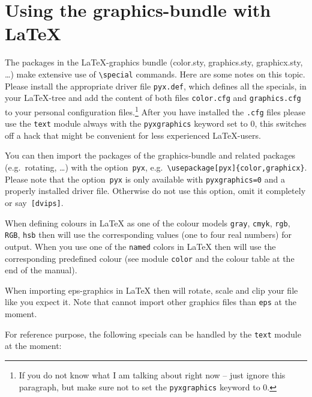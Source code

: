 \section{Using the graphics-bundle with \LaTeX}

The packages in the \LaTeX-graphics bundle (color.sty, graphics.sty,
graphicx.sty, \ldots) make extensive use of \verb|\special| commands.
Here are some notes on this topic. Please install the appropriate
driver file \verb|pyx.def|, which defines all the specials, in your
\LaTeX-tree and add the content of both files \verb|color.cfg| and
\verb|graphics.cfg| to your personal configuration files.\footnote{If
you do not know what I am talking about right now -- just ignore this
paragraph, but make sure not to set the \texttt{pyxgraphics} keyword
to 0.} After you have installed the \verb|.cfg| files please use the
\verb|text| module always with the \verb|pyxgraphics| keyword set to
0, this switches off a hack that might be convenient for less
experienced \LaTeX-users.

You can then import the packages of the graphics-bundle and related
packages (e.g.~rotating, \ldots) with the option~\verb|pyx|,
e.g.~\verb|\usepackage[pyx]{color,graphicx}|. Please note that the
option~\verb|pyx| is only available with \verb|pyxgraphics=0| and a
properly installed driver file. Otherwise do not use this option, omit
it completely or say~\verb|[dvips]|.

When defining colours in \LaTeX{} as one of the colour models
\verb|gray|, \verb|cmyk|, \verb|rgb|, \verb|RGB|, \verb|hsb| then
\PyX{} will use the corresponding values (one to four real numbers)
for output. When you use one of the \verb|named| colors in \LaTeX{}
then \PyX{} will use the corresponding predefined colour (see module
\verb|color| and the colour table at the end of the manual).

When importing eps-graphics in \LaTeX{} then \PyX{} will rotate, scale
and clip your file like you expect it. Note that \PyX{} cannot import
other graphics files than \verb|eps| at the moment.

For reference purpose, the following specials can be handled by the
\verb|text| module at the moment:\medskip

